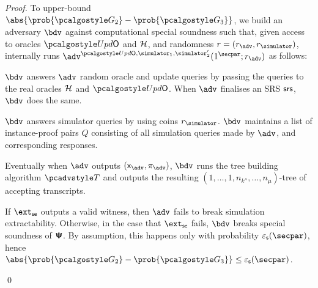 \begin{proof}
 	To upper-bound $\abs{\prob{\game{2}} - \prob{\game{3}}}$, we build an adversary $\bdv$ against computational special soundness such that,
	given access to oracles $\initU$ and $\mathcal{H}$, and randomness $r = (r_\adv, \rsim)$,
	internally runs $\advse^{\initU, \simulator_1, \simulator_2'} (1^\secpar; r_\adv)$ as follows:
	\begin{compactenum}
		\item $\bdv$ answers $\adv$ random oracle and update queries by passing the queries to the real
		oracles $\mathcal{H}$ and $\initU$. When $\adv$ finalises an SRS $\mathsf{srs}$, $\bdv$ does the same.
		\item $\bdv$ answers simulator queries by using coins $\rsim$. $\bdv$ maintains a
		list of instance-proof pairs $Q$ consisting of all simulation queries made by
		$\adv$, and corresponding responses.
		\item Eventually when $\adv$ outputs $(\inp_\advse, \zkproof_\advse)$, $\bdv$ runs the tree building algorithm $\tdv$ and outputs the resulting $(1, \ldots, 1, n_{k''}, \ldots, n_\mu)$-tree of accepting transcripts.
	\end{compactenum}	
	If $\extse$ outputs a valid witness, then $\adv$ fails to break simulation extractability. Otherwise, in the case that $\extse$ fails, $\bdv$ breaks special soundness  of $\bm{\mathsf{\Psi}}$. By assumption, this happens only with probability $\epss(\secpar)$, hence $\abs{\prob{\game{2}} - \prob{\game{3}}} \leq \epss(\secpar)$.
	
	\qed
\end{proof}


